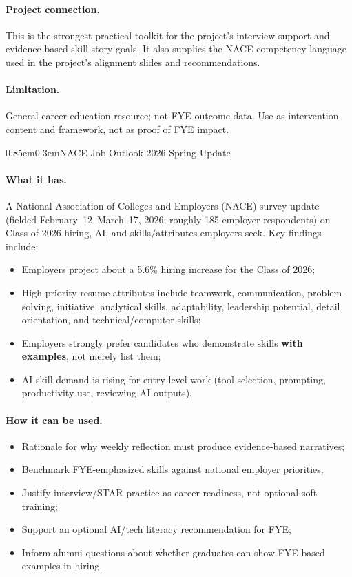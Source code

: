 \documentclass[11pt,letterpaper]{article}
\makeatletter
\renewcommand\subsection{\@startsection{subsection}{2}{\z@}%
  {0.85em}{0.3em}{\normalsize\bfseries}}
\makeatother
\begin{document}
\paragraph{Project connection.}
This is the strongest practical toolkit for the project's interview-support and evidence-based skill-story goals. It also supplies the NACE competency language used in the project's alignment slides and recommendations.

\paragraph{Limitation.}
General career education resource; not FYE outcome data. Use as intervention content and framework, not as proof of FYE impact.

\subsection{NACE Job Outlook 2026 Spring Update}
\paragraph{What it has.}
A National Association of Colleges and Employers (NACE) survey update (fielded February~12--March~17, 2026; roughly 185 employer respondents) on Class of 2026 hiring, AI, and skills/attributes employers seek. Key findings include:
\begin{itemize}
  \item Employers project about a 5.6\% hiring increase for the Class of 2026;
  \item High-priority resume attributes include teamwork, communication, problem-solving, initiative, analytical skills, adaptability, leadership potential, detail orientation, and technical/computer skills;
  \item Employers strongly prefer candidates who demonstrate skills \textbf{with examples}, not merely list them;
  \item AI skill demand is rising for entry-level work (tool selection, prompting, productivity use, reviewing AI outputs).
\end{itemize}

\paragraph{How it can be used.}
\begin{itemize}
  \item Rationale for why weekly reflection must produce evidence-based narratives;
  \item Benchmark FYE-emphasized skills against national employer priorities;
  \item Justify interview/STAR practice as career readiness, not optional soft training;
  \item Support an optional AI/tech literacy recommendation for FYE;
  \item Inform alumni questions about whether graduates can show FYE-based examples in hiring.
\end{itemize}
\end{document}
